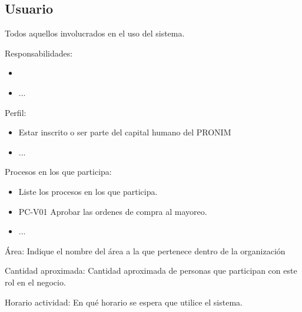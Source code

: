 \begin{Usuario}{\hypertarget{Usuario}{\subsection{Usuario}}}{
			Todos aquellos involucrados en el uso del sistema.
		}
		\item[Responsabilidades:] \cdtEmpty
		\begin{itemize}
			\item 
			\item ...
		\end{itemize}
		
		\item[Perfil:] \cdtEmpty
		\begin{itemize}
			\item Estar inscrito o ser parte del  capital humano del PRONIM
			\item ...
		\end{itemize}
		\item[Procesos en los que participa:] \cdtEmpty
		\begin{itemize}
			\item Liste los procesos en los que participa.
			\item PC-V01 Aprobar las ordenes de compra al mayoreo.
			\item ...
		\end{itemize}
		\item[Área:] Indique el nombre del área a la que pertenece dentro de la organización
		\item[Cantidad aproximada:] Cantidad aproximada de personas que participan con este rol en el negocio.
		\item[Horario actividad:] En qué horario se espera que utilice el sistema. 
	\end{Usuario}
